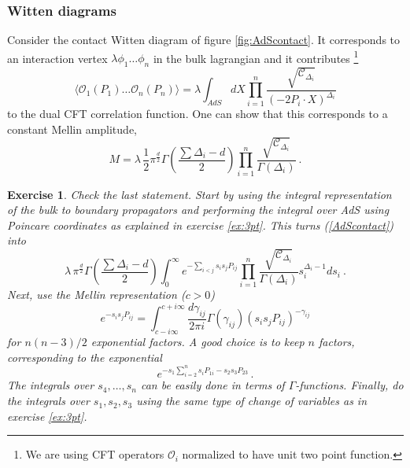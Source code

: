 \documentclass{ws-rv9x6}
\newtheorem{exercise}{Exercise}[section]
\newcommand\be{\begin{equation}}
\newcommand\ee{\end{equation}}
\newcommand\D{\Delta}
\newcommand\Op{\mathcal{O}}
\begin{document}
\subsubsection{Witten diagrams}

Consider the contact Witten diagram of figure \ref{fig:AdScontact}. It corresponds to an interaction vertex $\lambda \phi_1 \dots \phi_n$ in the bulk lagrangian and it contributes \footnote{We are using CFT operators $\Op_i$ normalized to have unit two point function.}
\be
\langle \Op_1(P_1) \dots \Op_n(P_n) \rangle = \lambda \int_{AdS} dX \prod_{i=1}^n \frac{ \sqrt{\mathcal{C}_{\D_i}}}{
(-2P_i \cdot X)^{\D_i}} \label{AdScontact}
\ee
to the dual CFT correlation function.
One can show that this corresponds to a constant Mellin amplitude,
\be
M=\lambda\, \frac{1}{2}\pi^{\frac{d}{2}}\Gamma\left(\frac{\sum \D_i -d}{2} \right)
\prod_{i=1}^n \frac{ \sqrt{\mathcal{C}_{\D_i}}}{\Gamma(\D_i)}\ .
\ee
\begin{exercise}
\label{ex:Mellincontact}
Check the last statement. Start by using the integral representation of the bulk to boundary propagators and performing the integral over AdS using Poincare coordinates as explained in exercise \ref{ex:3pt}. This  turns (\ref{AdScontact}) into
\be
\lambda\, \pi^{\frac{d}{2}}\Gamma\left(\frac{\sum \D_i -d}{2} \right) 
\int_0^\infty  e^{-\sum_{i<j} s_i s_j P_{ij}}
\prod_{i=1}^n \frac{ \sqrt{\mathcal{C}_{\D_i}}}{\Gamma(\D_i)}
s_i^{\D_i-1} ds_i \ .
\ee
Next, use the Mellin representation ($c>0$)
\be
e^{-s_i s_j P_{ij}} =\int_{c-i\infty}^{c+i\infty} \frac{d\gamma_{ij}}{2\pi i} \Gamma(\gamma_{ij})  (s_i s_j P_{ij})^{-\gamma_{ij}}
\ee
for $n(n-3)/2$ exponential factors. A good choice is to keep $n$ factors, corresponding to the exponential
\be
e^{-s_1\sum_{i=2}^n  s_{i} P_{1i}-s_2s_3 P_{23}}\,.
\ee
The integrals over $s_4,\dots,s_n$ can be easily done in terms of $\Gamma$-functions. Finally, do the integrals over $s_1,s_2,s_3$ using the same type of change of variables as in exercise \ref{ex:3pt}. 
\end{exercise}
\end{document}
